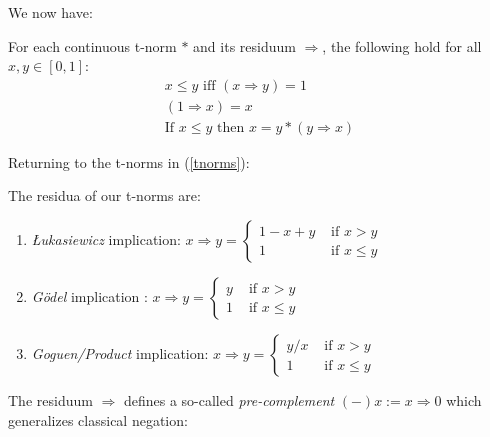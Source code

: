 We now have: 
\begin{lem}
	For each continuous t-norm $*$ and its residuum $\Rightarrow$, the following hold for all $x,y \in [0,1]$: \begin{gather*}
		x \leq y \text{ iff } (x\Rightarrow y)=1 \\
		(1 \Rightarrow x) = x \\
		\text{If } x \leq y \text{ then } x=y*(y\Rightarrow x)
	\end{gather*}
\end{lem}
 \newpage
Returning to the t-norms in (\ref{tnorms}):
\begin{thm}
	The residua of our t-norms are:
	 \begin{enumerate}[label=(\roman*)]
	 	\item \emph{\L{}ukasiewicz} implication: $x \Rightarrow y = 
	 	\begin{cases}
	 		1 - x + y & \text{ if } x > y \\
	 		1 & \text{ if } x \leq y
	 	\end{cases}$
	 	\item \emph{Gödel} implication : $x \Rightarrow y = 
	 		\begin{cases}
	 			y & \text{ if } x > y \\
	 			1 & \text{ if } x \leq y
	 		\end{cases}$
	 	\item \emph{Goguen/Product} implication: $x \Rightarrow y = 
	 	\begin{cases}
	 		y/x & \text{ if } x > y \\
	 		1 & \text{ if } x \leq y
	 	\end{cases}$
	 \end{enumerate}	
\end{thm} 
 
 The residuum $\Rightarrow$ defines a so-called \emph{pre-complement} $(-)x := x \Rightarrow 0$ which generalizes classical negation:
 
